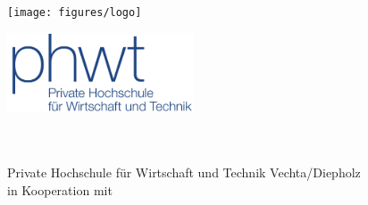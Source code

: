 \thispagestyle{plain}
\begin{titlepage}
    \begin{center}
        \begin{minipage}{0.5\textwidth}
            \vspace{-1.5cm}
            \centering
            \texttt{[image: figures/logo]}
        \end{minipage}%
        \hfill
        \begin{minipage}{0.5\textwidth}
            \vspace{-1.5cm}
            \centering
            \includegraphics[width=5.5cm]{sources/LOGO_PHWT}
        \end{minipage}
        
        \huge{\textbf{\art}}\\[1.5ex]
        
        \LARGE{\titel}\\[2ex]
        
        \large{Private Hochschule für Wirtschaft und Technik Vechta/Diepholz\\
            in Kooperation mit \companyname\\}
        
        \vspace{0.8cm}
        \normalsize
        \onehalfspacing
        

\end{center}
\end{titlepage}
